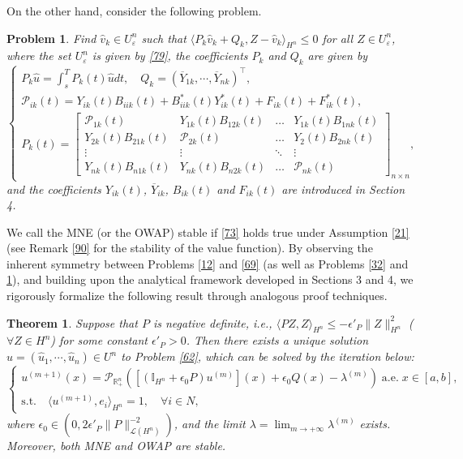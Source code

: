 \documentclass[10pt]{article}
\newtheorem{thm}{Theorem}[section]
\newtheorem{prob}{Problem}[section]
\begin{document}
On the other hand, consider the following problem.
\begin{prob}\label{70}
Find $\widehat{v}_k\in U^n_{\varepsilon}$ such  that
$
\langle P_k\widehat{v}_k+Q_k,Z-\widehat{v}_k\rangle_{H^n}\leq 0$  for all $Z\in U^n_{\varepsilon}$, where the set $U^n_{\varepsilon}$ is given by \eqref{79}, the coefficients  $P_k$ and $Q_k$ are given by
\begin{equation*}
\begin{cases}
P_k\widehat{u}=\int_s^TP_k(t)\widehat{u}dt,\quad Q_k=(\overline{Y}_{1k},\cdots,\overline{Y}_{nk})^{\top},\\
\mathcal{P}_{ik}(t)=Y_{ik}(t)B_{iik}(t)+B^*_{iik}(t)Y^*_{ik}(t)+F_{ik}(t)+F^*_{ik}(t),\\
P_k(t)=\begin{bmatrix}
\mathcal{P}_{1k}(t) & Y_{1k}(t)B_{12k}(t)&\dots & Y_{1k}(t)B_{1nk}(t)\\
  Y_{2k}(t)B_{21k}(t)& \mathcal{P}_{2k}(t)&\dots & Y_2(t)B_{2nk}(t)\\
\vdots &\vdots & \ddots&\vdots\\
Y_{nk}(t)B_{n1k}(t)&Y_{nk}(t)B_{n2k}(t)&\dots & \mathcal{P}_{nk}(t)
\end{bmatrix}_{n \times n},
\end{cases}
\end{equation*}
and the coefficients $Y_{ik}(t)$, $\overline{Y}_{ik}$, $B_{ik}(t)$ and $F_{ik}(t)$ are introduced in Section 4.
\end{prob}
We call the  MNE (or the OWAP)  stable if \eqref{73} holds true under Assumption \ref{21} (see Remark \ref{90} for the stability of the value function). By observing the inherent symmetry between Problems \ref{12} and \ref{69} (as well as Problems \ref{32} and \ref{70}), and building upon the analytical framework developed in Sections 3 and 4, we rigorously formalize the following result through analogous proof techniques.
\begin{thm}\label{65}
Suppose that $P$ is negative definite, i.e., $\langle PZ,Z\rangle_{H^n}\leq -\epsilon'_P\|Z\|^2_{H^n}$  ($\forall Z\in H^{n}$)
for some constant $\epsilon'_P>0$. Then there exists a unique solution $\widehat{u}=(\widehat{u}_1,\cdots,\widehat{u}_n)\in U^n$ to Problem \ref{62}, which can be solved by the iteration below:
  \begin{equation}\label{53}
   \begin{cases}
u^{(m+1)}(x)=\mathcal{P}_{\mathbb{R}^n_+}([(\mathbb{I}_{H^n}+\epsilon_0P){u^{(m)}}](x)+\epsilon_0Q(x)-\lambda^{(m)})\; \mbox{a.e.} \;x\in[a,b],\\
\mbox{s.t.}\quad \langle u^{(m+1)},e_i\rangle_{H^n}=1,\quad\forall i\in N,
   \end{cases}
 \end{equation}
 where  $\epsilon_0\in(0,2\epsilon'_P\|P\|_{\mathcal{L}(H^n)}^{-2})$, and the limit $\lambda=\lim_{m\rightarrow+\infty}\lambda^{(m)}$  exists.  Moreover, both   MNE  and   OWAP   are stable.
\end{thm}
\end{document}
